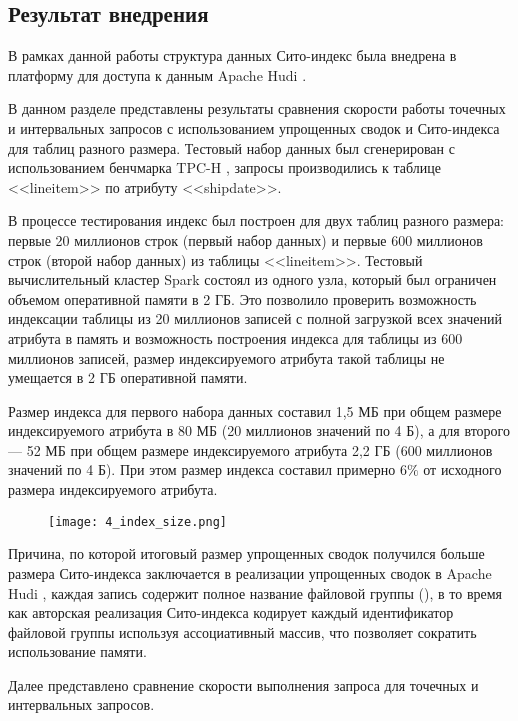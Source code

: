 \subsection{Результат внедрения}
В рамках данной работы структура данных Сито-индекс была внедрена в платформу для доступа к данным Apache Hudi .

В данном разделе представлены результаты сравнения скорости работы точечных и интервальных запросов с использованием упрощенных сводок и Сито-индекса для таблиц разного размера. Тестовый набор данных был сгенерирован с использованием бенчмарка TPC-H , запросы производились к таблице {<<lineitem>>} по атрибуту {<<shipdate>>}.

В процессе тестирования индекс был построен для двух таблиц разного размера: первые 20 миллионов строк (первый набор данных) и первые 600 миллионов строк (второй набор данных) из таблицы {<<lineitem>>}. Тестовый вычислительный кластер Spark состоял из одного узла, который был ограничен объемом оперативной памяти в 2 ГБ. Это позволило проверить возможность индексации таблицы из 20 миллионов записей с полной загрузкой всех значений атрибута в память и возможность построения индекса для таблицы из 600 миллионов записей, размер индексируемого атрибута такой таблицы не умещается в 2 ГБ оперативной памяти.

Размер индекса для первого набора данных составил 1,5 МБ при общем размере индексируемого атрибута в 80 МБ (20 миллионов значений по 4 Б), а для второго — 52 МБ при общем размере индексируемого атрибута 2,2 ГБ (600 миллионов значений по 4 Б). При этом размер индекса составил примерно $6\%$ от исходного размера индексируемого атрибута.

\begin{figure}[h]
    \centering
    \texttt{[image: 4\_index\_size.png]}
    \caption{}
\end{figure}

Причина, по которой итоговый размер упрощенных сводок получился больше размера Сито-индекса заключается в реализации упрощенных сводок в Apache Hudi , каждая запись содержит полное название файловой группы (), в то время как авторская реализация Сито-индекса кодирует каждый идентификатор файловой группы используя ассоциативный массив, что позволяет сократить использование памяти. 

Далее представлено сравнение скорости выполнения запроса для точечных и интервальных запросов.

